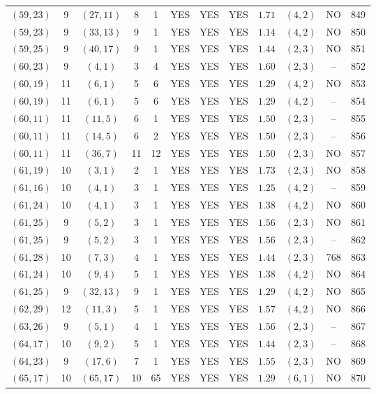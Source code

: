 \begin{longtable}{|c|c|c|c|c|c|c|c|c|c|c|c|}
$(59,23)$ & 9 & $(27,11)$ & 8 & 1 & YES & YES & YES & $1.71$ & $(4,2)$ & NO & 849\\
$(59,23)$ & 9 & $(33,13)$ & 9 & 1 & YES & YES & YES & $1.14$ & $(4,2)$ & NO & 850\\
$(59,25)$ & 9 & $(40,17)$ & 9 & 1 & YES & YES & YES & $1.44$ & $(2,3)$ & NO & 851\\
$(60,23)$ & 9 & $(4,1)$ & 3 & 4 & YES & YES & YES & $1.60$ & $(2,3)$ & -- & 852\\
$(60,19)$ & 11 & $(6,1)$ & 5 & 6 & YES & YES & YES & $1.29$ & $(4,2)$ & NO & 853\\
$(60,19)$ & 11 & $(6,1)$ & 5 & 6 & YES & YES & YES & $1.29$ & $(4,2)$ & -- & 854\\
$(60,11)$ & 11 & $(11,5)$ & 6 & 1 & YES & YES & YES & $1.50$ & $(2,3)$ & -- & 855\\
$(60,11)$ & 11 & $(14,5)$ & 6 & 2 & YES & YES & YES & $1.50$ & $(2,3)$ & -- & 856\\
$(60,11)$ & 11 & $(36,7)$ & 11 & 12 & YES & YES & YES & $1.50$ & $(2,3)$ & NO & 857\\
$(61,19)$ & 10 & $(3,1)$ & 2 & 1 & YES & YES & YES & $1.73$ & $(2,3)$ & NO & 858\\
$(61,16)$ & 10 & $(4,1)$ & 3 & 1 & YES & YES & YES & $1.25$ & $(4,2)$ & -- & 859\\
$(61,24)$ & 10 & $(4,1)$ & 3 & 1 & YES & YES & YES & $1.38$ & $(4,2)$ & NO & 860\\
$(61,25)$ & 9 & $(5,2)$ & 3 & 1 & YES & YES & YES & $1.56$ & $(2,3)$ & NO & 861\\
$(61,25)$ & 9 & $(5,2)$ & 3 & 1 & YES & YES & YES & $1.56$ & $(2,3)$ & -- & 862\\
$(61,28)$ & 10 & $(7,3)$ & 4 & 1 & YES & YES & YES & $1.44$ & $(2,3)$ & 768 & 863\\
$(61,24)$ & 10 & $(9,4)$ & 5 & 1 & YES & YES & YES & $1.38$ & $(4,2)$ & NO & 864\\
$(61,25)$ & 9 & $(32,13)$ & 9 & 1 & YES & YES & YES & $1.29$ & $(4,2)$ & NO & 865\\
$(62,29)$ & 12 & $(11,3)$ & 5 & 1 & YES & YES & YES & $1.57$ & $(4,2)$ & NO & 866\\
$(63,26)$ & 9 & $(5,1)$ & 4 & 1 & YES & YES & YES & $1.56$ & $(2,3)$ & -- & 867\\
$(64,17)$ & 10 & $(9,2)$ & 5 & 1 & YES & YES & YES & $1.44$ & $(2,3)$ & -- & 868\\
$(64,23)$ & 9 & $(17,6)$ & 7 & 1 & YES & YES & YES & $1.55$ & $(2,3)$ & NO & 869\\
$(65,17)$ & 10 & $(65,17)$ & 10 & 65 & YES & YES & YES & $1.29$ & $(6,1)$ & NO & 870\\

\end{longtable}
